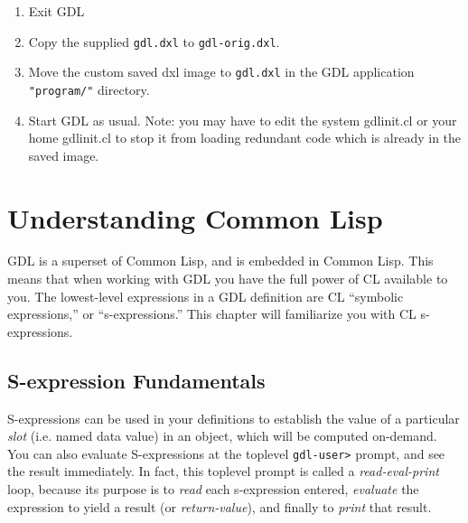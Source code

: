 \documentclass [11pt]{book}
\begin{document}
\begin{enumerate}

\item Exit GDL

\item Copy the supplied \texttt{gdl.dxl} to \texttt{gdl-orig.dxl}.

\item Move the custom saved dxl image to \texttt{gdl.dxl} in the GDL application \texttt{"program/"} directory.

\item Start GDL as usual. Note: you may have to edit the system gdlinit.cl or your home gdlinit.cl
to stop it from loading redundant code which is already in the saved image.

\end{enumerate}



\chapter{Understanding Common Lisp}

\label{chap:understandingcommonlisp}



GDL is a superset of Common Lisp, and is embedded in Common
Lisp. This means that when working with GDL you have the full power
of CL available to you. The lowest-level expressions in a GDL
definition are CL ``symbolic expressions,'' or ``s-expressions.''
This chapter will familiarize you with CL s-expressions.



\section{S-expression Fundamentals}

\label{sec:s-expressionfundamentals}



S-expressions can be used in your definitions to establish
the value of a particular \emph{slot} (i.e. named data value) in an object, which will be
computed on-demand. You can also evaluate S-expressions at the
toplevel \texttt{gdl-user\textgreater} prompt, and see the result immediately. In fact, this toplevel prompt is called a \emph{read-eval-print} loop, because its purpose is to \emph{read} each s-expression  entered, \emph{evaluate} the expression to yield a result (or \emph{return-value}), and finally to \emph{print} that result.
\end{document}
